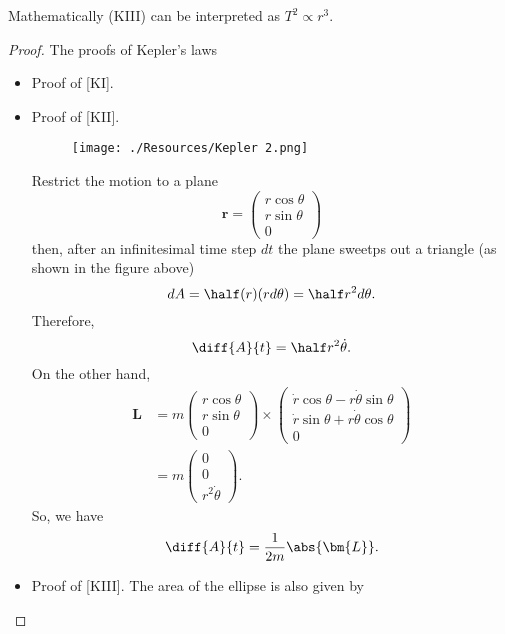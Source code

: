 \documentclass[12pt, a4paper]{article}
\begin{document}
\begin{mdnote}
    Mathematically (KIII) can be interpreted as \(T^2 \propto r^3\).
\end{mdnote}

\begin{proof}
    The proofs of Kepler's laws 
    \begin{itemize}
        \item Proof of [KI].
        \item Proof of [KII].
        \begin{figure}[H]
             \begin{center}
                 \texttt{[image: ./Resources/Kepler 2.png]}
             \end{center}
        \end{figure}
        Restrict the motion to a plane 
    \[\bm{r} = \begin{pmatrix}
        r\cos\theta \\
        r\sin\theta \\
        0   
    \end{pmatrix}\]
    then, after an infinitesimal time step \(dt\) the plane sweetps out a triangle (as shown in the figure above)
    \[dA = \half (r)(r d\theta) = \half r^2 d\theta.\]
    Therefore, 
    \[\diff{A}{t} = \half r^2 \dot{\theta}.\]
    On the other hand,
    \[\begin{aligned}
        \bm{L} &= m\begin{pmatrix}
            r\cos\theta \\
            r\sin\theta \\
            0   
        \end{pmatrix}
        \times 
        \begin{pmatrix}
            \dot{r}\cos\theta -r\dot{\theta}\sin\theta \\
            \dot{r}\sin\theta +r\dot{\theta}\cos\theta \\
            0
        \end{pmatrix} \\
        &= m \begin{pmatrix}
            0 \\0 \\ r^2 \dot{\theta}
        \end{pmatrix}.
    \end{aligned}\]
    So, we have 
    \[\diff{A}{t} = \frac{1}{2m} \abs{\bm{L}}.\]
        \item Proof of [KIII].
        The area of the ellipse is also given by 

\end{itemize}
\end{proof}
\end{document}
